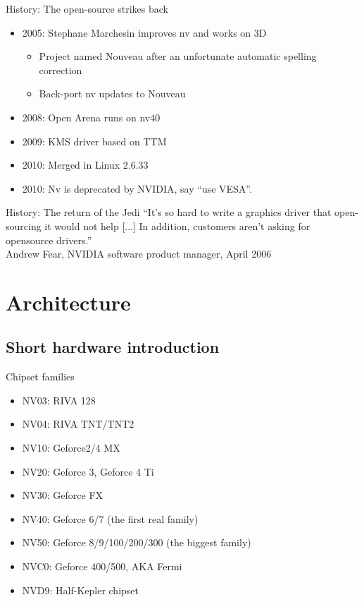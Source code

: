 \documentclass[11pt,english,compress]{beamer}
\begin{document}
	\begin{frame}
		\begin{block}{History: The open-source strikes back}
			\begin{itemize}
				\item 2005: Stephane Marchesin improves nv and works on 3D
				\begin{itemize}
					\item Project named Nouveau after an unfortunate automatic spelling correction
					\item Back-port nv updates to Nouveau
				\end{itemize}
				\item 2008: Open Arena runs on nv40
				\item 2009: KMS driver based on TTM
				\item 2010: Merged in Linux 2.6.33
				\item 2010: Nv is deprecated by NVIDIA, say ``use VESA''.
			\end{itemize}
		\end{block}
	\end{frame}

	\begin{frame}
		\begin{block}{History: The return of the Jedi}
			``It's so hard to write a graphics driver that open-sourcing it
			would not help [...] In addition, customers aren't asking for opensource drivers.''\\
			Andrew Fear, NVIDIA software product manager, April 2006
		\end{block}
	\end{frame}

\section{Architecture}
	\subsection{Short hardware introduction}
		\begin{frame}
			\begin{block}{Chipset families}
				\begin{itemize}
					\item NV03: RIVA 128
					\item NV04: RIVA TNT/TNT2
					\item NV10: Geforce2/4 MX
					\item NV20: Geforce 3, Geforce 4 Ti
					\item NV30: Geforce FX
					\item NV40: Geforce 6/7 (the first real family) 
					\item NV50: Geforce 8/9/100/200/300 (the biggest family)
					\item NVC0: Geforce 400/500, AKA Fermi
					\item NVD9: Half-Kepler chipset
				\end{itemize}
			\end{block}
		\end{frame}
\end{document}
